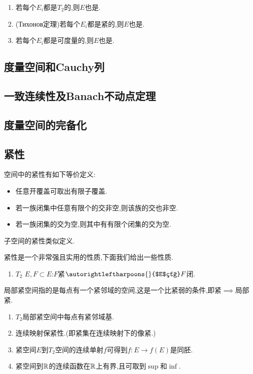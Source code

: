 \documentclass{article}
\begin{document}
\begin{enumerate}[resume]
    \item 若每个$E_i$都是$T_2$的,则$E$也是.
    \item (Тихонов定理)若每个$E_i$都是紧的,则$E$也是.
    \item 若每个$E_i$都是可度量的,则$E$也是.
\end{enumerate}
\subsection{度量空间和Cauchy列}

\subsection{一致连续性及Banach不动点定理}

\subsection{度量空间的完备化}

\subsection{紧性}
空间中的紧性有如下等价定义:
\begin{itemize}
    \item 任意开覆盖可取出有限子覆盖.
    \item 若一族闭集中任意有限个的交非空,则该族的交也非空.
    \item 若一族闭集的交为空,则其中有有限个闭集的交为空.
\end{itemize}
子空间的紧性类似定义.

紧性是一个非常强且实用的性质,下面我们给出一些性质.

\begin{enumerate}
    \item $T_2$ $E, F\subset E$:$F$紧$\autorightleftharpoons{}{$E$紧} F$闭.\\
\end{enumerate}

局部紧空间指的是每点有一个紧邻域的空间,这是一个比紧弱的条件,即紧$\implies$局部紧.

\begin{enumerate}[resume]
    \item $T_2$局部紧空间中每点有紧邻域基.\\
    \item 连续映射保紧性.(即紧集在连续映射下的像紧.)
    \item 紧空间$E$到$T_2$空间的连续单射$f$可得到$f:E\to f(E)$是同胚.
    \item 紧空间到$\mathbb{R}$的连续函数在$\mathbb{R}$上有界,且可取到$\sup$和$\inf$.
\end{enumerate}
\end{document}
